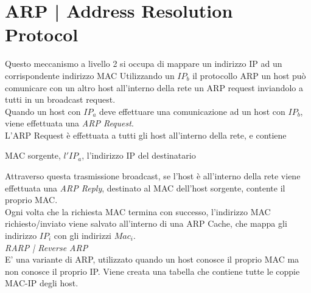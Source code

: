 \documentclass[11pt, oneside]{article}   	%
\begin{document}
\section*{ARP | Address Resolution Protocol}
Questo meccanismo a livello 2 si occupa di mappare un indirizzo IP ad un corrispondente indirizzo MAC Utilizzando un $IP_b$ il protocollo ARP un host può comunicare con un altro host all'interno della rete un ARP request inviandolo a tutti in un broadcast request.\\
Quando un host con $IP_a$ deve effettuare una comunicazione ad un host con $IP_b$, viene effettuata una \emph{ARP Request}. \\L'ARP Request è effettuata a tutti gli host all'interno della rete, e contiene \begin{center}
MAC sorgente, $l'IP_a$, l'indirizzo IP del destinatario
\end{center} Attraverso questa trasmissione broadcast, se l'host è all'interno della rete viene effettuata una \emph{ARP Reply}, destinato al MAC dell'host sorgente, contente il proprio MAC.\\
Ogni volta che la richiesta MAC termina con successo, l'indirizzo MAC richiesto/inviato viene salvato all'interno di una ARP Cache, che mappa gli indirizzo $IP_i$ con gli indirizzi $Mac_i$.\\
\emph{RARP | Reverse ARP}\\
E' una variante di ARP, utilizzato quando un host conosce il proprio MAC ma non conosce il proprio IP. Viene creata una tabella che contiene tutte le coppie MAC-IP degli host.
\end{document}

